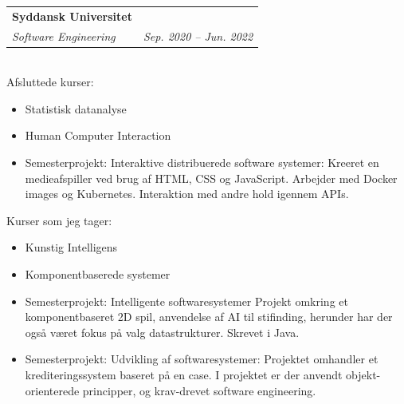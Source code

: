 \documentclass[11pt]{article}
\makeatletter
\newcommand{\resumeSubheading}[4]{
  \noindent\begin{tabular*}{0.98\textwidth}[t]{l@{\extracolsep{\fill}}r}
    \noindent \textbf{#1} & #2 \\ \vspace{-3pt} 
    \noindent \textit{\small#3} & \textit{\small #4} 
  \end{tabular*}\vspace{7pt}
}
\makeatother
\begin{document}
\resumeSubheading{Syddansk Universitet}{}{Software Engineering}{Sep.
2020 -- Jun. 2022}\\\vspace{0.25cm}
{\indent\small Afsluttede kurser: }
  \vspace{-0.3cm}
  {\small 
  \begin{itemize}
  \setlength{\itemsep}{-1pt}
    \item Statistisk datanalyse
    \item Human Computer Interaction
    \item Semesterprojekt: Interaktive distribuerede software systemer:
      \subitem Kreeret en medieafspiller ved brug af HTML, CSS og JavaScript.
      Arbejder med Docker images og Kubernetes. Interaktion med andre hold
      igennem APIs.
\end{itemize}} 
{\indent\small Kurser som jeg tager:}
  {\small 
  \begin{itemize}
  \setlength{\itemsep}{-1pt}
    \item Kunstig Intelligens
    \item Komponentbaserede systemer
    \item Semesterprojekt: Intelligente softwaresystemer
      \subitem Projekt omkring et komponentbaseret 2D spil, anvendelse af AI til
      stifinding, herunder har der også været fokus på valg datastrukturer.
      Skrevet i Java.
    \item Semesterprojekt: Udvikling af softwaresystemer:
      \subitem Projektet omhandler et krediteringssystem baseret på en case. I
      projektet er der anvendt objekt-orienterede principper, og krav-drevet
      software engineering.
  \end{itemize}} 


\vspace{0.3cm}
\end{document}
